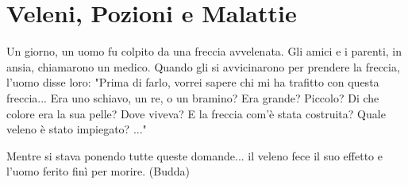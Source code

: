 \section{Veleni, Pozioni e Malattie}

\label{veleni-e-pozioni}

\begin{enfasi}{
Un giorno, un uomo fu colpito da una freccia avvelenata. Gli amici e i parenti, in ansia, chiamarono un medico. Quando gli si avvicinarono per prendere la freccia, l'uomo disse loro: "Prima di farlo, vorrei sapere chi mi ha trafitto con questa freccia... Era uno schiavo, un re, o un bramino? Era grande? Piccolo? Di che colore era la sua pelle? Dove viveva? E la freccia com'è stata costruita? Quale veleno è stato impiegato? ..."

Mentre si stava ponendo tutte queste domande... il veleno fece il suo effetto e l'uomo ferito finì per morire. (Budda)}\end{enfasi}

